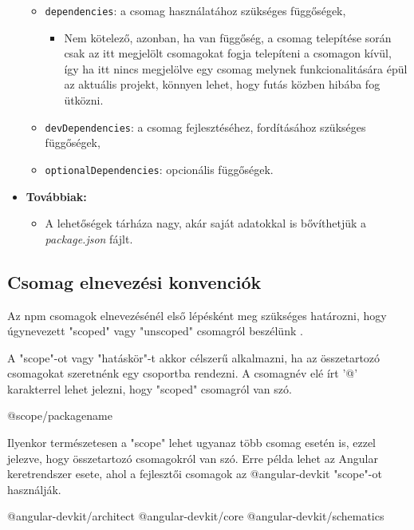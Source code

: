\begin{itemize}
\begin{itemize}
			\item \texttt{dependencies}: a csomag használatához szükséges függőségek,
			\begin{itemize}
				\item Nem kötelező, azonban, ha van függőség, a csomag telepítése során csak az itt megjelölt csomagokat fogja telepíteni a csomagon kívül, így ha itt nincs megjelölve egy csomag melynek funkcionalitására épül az aktuális projekt, könnyen lehet, hogy futás közben hibába fog ütközni.
			\end{itemize}
			\item \texttt{devDependencies}: a csomag fejlesztéséhez, fordításához szükséges függőségek,
			\item \texttt{optionalDependencies}: opcionális függőségek.
		\end{itemize}
		\item \textbf{Továbbiak:}
		\begin{itemize}
			\item A lehetőségek tárháza nagy, akár saját adatokkal is bővíthetjük a \emph{package.json} fájlt. 
		\end{itemize}
	\end{itemize}

	\subsection{Csomag elnevezési konvenciók}
	
	Az npm csomagok elnevezésénél első lépésként meg szükséges határozni, hogy úgynevezett "scoped" vagy "unscoped" csomagról beszélünk \cite{npm-scope}.
	
	A "scope"-ot vagy "hatáskör"-t akkor célszerű alkalmazni, ha az összetartozó csomagokat szeretnénk egy csoportba rendezni. A csomagnév elé írt '@' karakterrel lehet jelezni, hogy "scoped" csomagról van szó.
	
	\begin{js}
@scope/packagename
	\end{js}

	Ilyenkor természetesen a "scope" lehet ugyanaz több csomag esetén is, ezzel jelezve, hogy összetartozó csomagokról van szó.
	Erre példa lehet az Angular keretrendszer esete, ahol a fejlesztői csomagok az @angular-devkit "scope"-ot használják.
	
	\begin{js}
@angular-devkit/architect
@angular-devkit/core
@angular-devkit/schematics
	\end{js}

